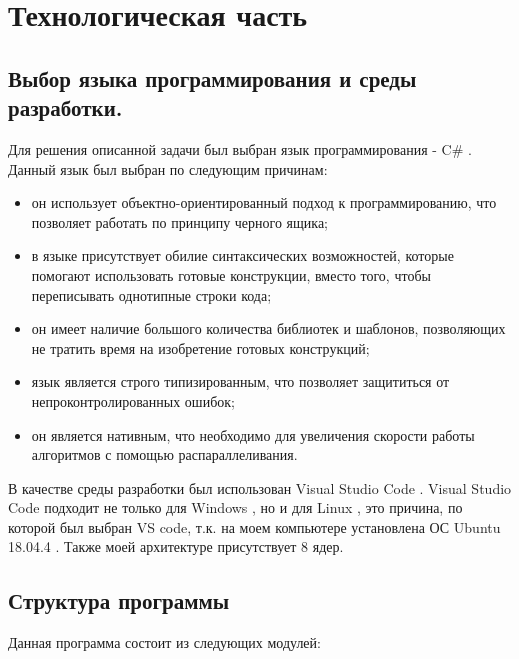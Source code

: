 \chapter{Технологическая часть}

\section{Выбор языка программирования и среды разработки.}

Для решения описанной задачи был выбран язык программирования - C\# \cite{Microsoft}.
Данный язык был выбран по следующим причинам:

\begin{itemize}
	\item он использует объектно-ориентированный подход к программированию,
	      что позволяет работать по принципу черного ящика;
	\item в языке присутствует обилие синтаксических возможностей,
	      которые помогают использовать готовые конструкции,
	      вместо того, чтобы переписывать однотипные строки кода;
	\item он имеет наличие большого количества библиотек и шаблонов,
	      позволяющих не тратить время на изобретение готовых конструкций;
	\item язык является строго типизированным,
	      что позволяет защититься от непроконтролированных ошибок;
	\item он является нативным, что необходимо
	      для увеличения скорости работы алгоритмов с помощью распараллеливания.
\end{itemize}

В качестве среды разработки был использован Visual Studio Code \cite{Vs}.
Visual Studio Code подходит не только для  Windows \cite{Win},
но и для Linux \cite{Lin}, это причина,
по которой был выбран VS code,
т.к. на моем компьютере установлена ОС Ubuntu 18.04.4 \cite{Ubuntu}.
Также моей архитектуре присутствует 8 ядер.

\section{Структура программы}

Данная программа состоит из следующих модулей:

